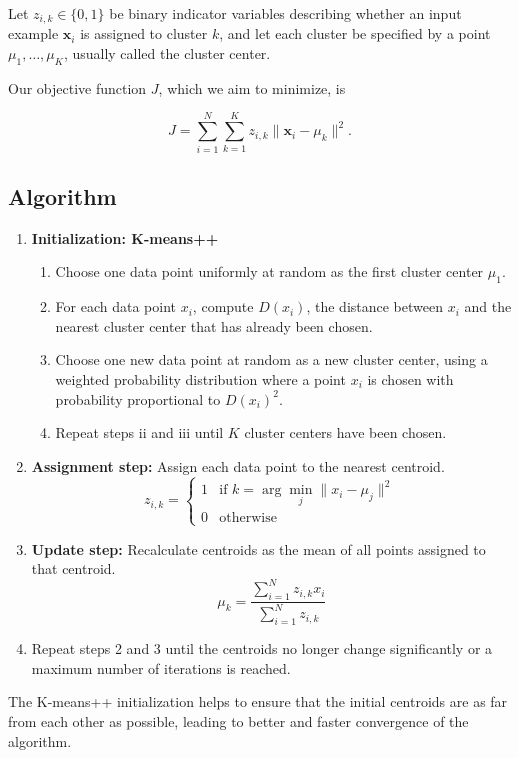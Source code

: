 \documentclass[11pt]{article}
\begin{document}
Let \( z_{i,k} \in \{0, 1\} \) be binary indicator variables describing whether an input example \( \mathbf{x}_i \) is assigned to cluster \( k \), and let each cluster be specified by a point \( \mu_1, \ldots, \mu_K \), usually called the cluster center.

Our objective function \( J \), which we aim to minimize, is

\[ J = \sum_{i=1}^{N} \sum_{k=1}^{K} z_{i,k} \|\mathbf{x}_i - \mu_k\|^2. \]

\subsection*{Algorithm}

\begin{enumerate}
    \item \textbf{Initialization: K-means++}
    \begin{enumerate}
        \item Choose one data point uniformly at random as the first cluster center \( \mu_1 \).
        \item For each data point \( x_i \), compute \( D(x_i) \), the distance between \( x_i \) and the nearest cluster center that has already been chosen.
        \item Choose one new data point at random as a new cluster center, using a weighted probability distribution where a point \( x_i \) is chosen with probability proportional to \( D(x_i)^2 \).
        \item Repeat steps ii and iii until \( K \) cluster centers have been chosen.
    \end{enumerate}
    \item \textbf{Assignment step:} Assign each data point to the nearest centroid.
    \[ z_{i,k} = 
    \begin{cases} 
    1 & \text{if } k = \arg\min_j \| x_i - \mu_j \|^2 \\
    0 & \text{otherwise}
    \end{cases}
    \]
    \item \textbf{Update step:} Recalculate centroids as the mean of all points assigned to that centroid.
    \[ \mu_k = \frac{\sum_{i=1}^N z_{i,k}x_i}{\sum_{i=1}^N z_{i,k}} \]
    \item Repeat steps 2 and 3 until the centroids no longer change significantly or a maximum number of iterations is reached.
\end{enumerate}

The K-means++ initialization helps to ensure that the initial centroids are as far from each other as possible, leading to better and faster convergence of the algorithm.
\end{document}
